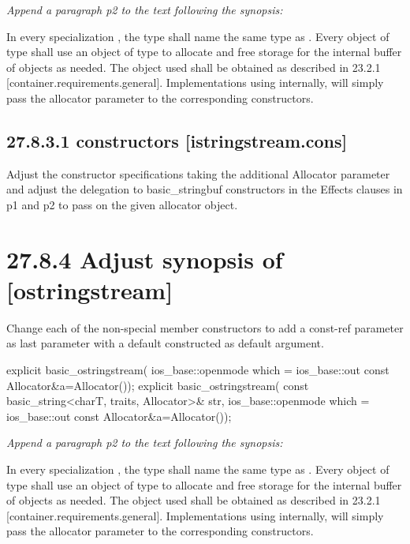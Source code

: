 \documentclass[ebook,11pt,article]{memoir}
\begin{document}
\textit{Append a paragraph p2 to the text following the synopsis:}

\pnum
In every specialization , the type  shall name the same type as . Every object of type  shall use an object of type  to allocate and free storage for the internal buffer of  objects as needed. The  object used shall be obtained as described in 23.2.1 [container.requirements.general].
\enternote
Implementations using  internally, will simply pass the allocator parameter to the corresponding  constructors.
\exitnote
\subsection{27.8.3.1  constructors [istringstream.cons]}
Adjust the constructor specifications taking the additional Allocator parameter and adjust the delegation to basic_stringbuf constructors in the Effects clauses in p1 and p2 to pass on the given allocator object.


\section{27.8.4 Adjust synopsis of  [ostringstream]}
Change each of the non-special member constructors to add a const-ref  parameter as last parameter with a default constructed  as default argument. 
\begin{codeblock}
explicit basic_ostringstream(
             ios_base::openmode which = ios_base::out
             const Allocator&a=Allocator());
explicit basic_ostringstream(
             const basic_string<charT, traits, Allocator>& str,
             ios_base::openmode which = ios_base::out
             const Allocator&a=Allocator());
\end{codeblock}

\textit{Append a paragraph p2 to the text following the synopsis:}

\pnum
In every specialization , the type  shall name the same type as . Every object of type  shall use an object of type  to allocate and free storage for the internal buffer of  objects as needed. The  object used shall be obtained as described in 23.2.1 [container.requirements.general].
\enternote
Implementations using  internally, will simply pass the allocator parameter to the corresponding  constructors.
\exitnote
\end{document}
